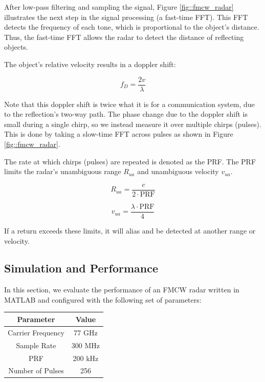 \documentclass[conference]{IEEEtran}
\begin{document}
	After low-pass filtering and sampling the signal, Figure \ref{fig::fmcw_radar} illustrates the next step in the signal processing (a fast-time FFT). This FFT detects the frequency of each tone, which is proportional to the object's distance. Thus, the fast-time FFT allows the radar to detect the distance of reflecting objects.
	
	The object's relative velocity results in a doppler shift:
	
	\begin{equation}
		f_D = \frac{2v}{\lambda}
	\end{equation}
	
	Note that this doppler shift is twice what it is for a communication system, due to the reflection's two-way path. The phase change due to the doppler shift is small during a single chirp, so we instead measure it over multiple chirps (pulses). This is done by taking a slow-time FFT across pulses as shown in Figure \ref{fig::fmcw_radar}.
	
	The rate at which chirps (pulses) are repeated is denoted as the PRF. The PRF limits the radar's unambiguous range $R_{ua}$ and unambiguous velocity $v_{ua}$.
	
	\begin{equation}
		R_{ua} = \frac{c}{2\cdot\text{PRF}}
		\label{eq::unambig_range}
	\end{equation}
	
	\begin{equation}
		v_{ua} = \frac{\lambda\cdot\text{PRF}}{4}
		\label{eq::unambig_velocity}
	\end{equation}
	
	If a return exceeds these limits, it will alias and be detected at another range or velocity.
	
	\subsection {Simulation and Performance}

In this section, we evaluate the performance of an FMCW radar written in MATLAB and configured with the following set of parameters:

	\begin{center}
	\begin{tabular}{|c|c|}
		\hline
		Parameter & Value \\
		\hline
		Carrier Frequency & 77 GHz \\
		\hline
		Sample Rate & 300 MHz \\
		\hline
		PRF & 200 kHz \\
		\hline
		Number of Pulses & 256 \\
		\hline	
	\end{tabular}
	\end{center}
	
\end{document}
